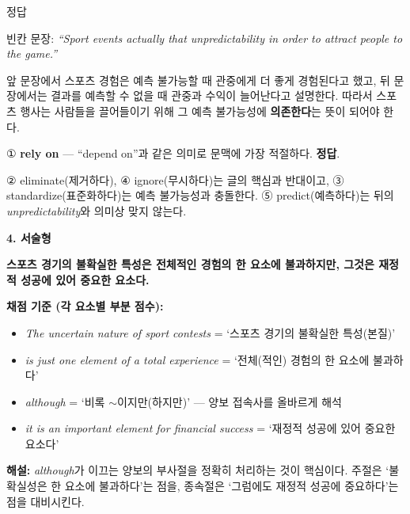 \documentclass[11pt,a4paper]{article}
\newcommand{\sol}[2]{\vspace{6pt}{\sffamily\bfseries #1} \quad 정답 \fbox{#2}\par\vspace{1pt}}
\begin{document}
\vspace{4pt}
\sol{3. 빈칸추론}{①}
빈칸 문장: \textit{``Sport events actually \underline{\hspace{3cm}} that unpredictability in order to attract people to the game.''}\par
앞 문장에서 스포츠 경험은 예측 불가능할 때 관중에게 더 좋게 경험된다고 했고, 뒤 문장에서는 결과를 예측할 수 없을 때 관중과 수익이 늘어난다고 설명한다. 따라서 스포츠 행사는 사람들을 끌어들이기 위해 그 예측 불가능성에 \textbf{의존한다}는 뜻이 되어야 한다.\par
① \textbf{rely on} — ``depend on''과 같은 의미로 문맥에 가장 적절하다. \textbf{정답}.\par
② eliminate(제거하다), ④ ignore(무시하다)는 글의 핵심과 반대이고, ③ standardize(표준화하다)는 예측 불가능성과 충돌한다. ⑤ predict(예측하다)는 뒤의 \textit{unpredictability}와 의미상 맞지 않는다.

\vspace{4pt}
{\sffamily\bfseries 4. 서술형}\par\vspace{2pt}
 \quad \textbf{스포츠 경기의 불확실한 특성은 전체적인 경험의 한 요소에 불과하지만, 그것은 재정적 성공에 있어 중요한 요소다.}\par\vspace{3pt}
\textbf{채점 기준 (각 요소별 부분 점수):}\par
\begin{itemize}[leftmargin=1.5em,itemsep=1pt,topsep=2pt]
\item \textit{The uncertain nature of sport contests} = `스포츠 경기의 불확실한 특성(본질)'
\item \textit{is just one element of a total experience} = `전체(적인) 경험의 한 요소에 불과하다'
\item \textit{although} = `비록 $\sim$이지만(하지만)' — 양보 접속사를 올바르게 해석
\item \textit{it is an important element for financial success} = `재정적 성공에 있어 중요한 요소다'
\end{itemize}
\vspace{2pt}\textbf{해설:} \textit{although}가 이끄는 양보의 부사절을 정확히 처리하는 것이 핵심이다. 주절은 `불확실성은 한 요소에 불과하다'는 점을, 종속절은 `그럼에도 재정적 성공에 중요하다'는 점을 대비시킨다.
\end{document}

